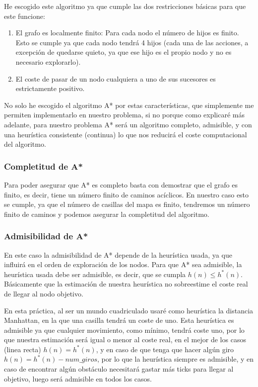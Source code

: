 \documentclass[10pt, spanish]{article}
\begin{document}
He escogido este algoritmo ya que cumple las dos restricciones básicas para que este funcione:

\begin{enumerate}
	\item El grafo es localmente finito: Para cada nodo el número de hijos es finito. Esto se cumple ya que cada nodo tendrá 4 hijos (cada una de las acciones, a excepción de quedarse quieto, ya que ese hijo es el propio nodo y no es necesario explorarlo).
	\item El coste de pasar de un nodo cualquiera a uno de sus sucesores es estrictamente positivo.
\end{enumerate}

No solo he escogido el algoritmo A* por estas características, que simplemente me permiten implementarlo en nuestro problema, si no porque como explicaré más adelante, para nuestro problema A* será un algoritmo completo, admisible, y con una heurística consistente (continua) lo que nos reducirá el coste computacional del algoritmo.

\subsubsection{Completitud de A*}

Para poder asegurar que A* es completo basta con demostrar que el grafo es finito, es decir, tiene un número finito de caminos acíclicos. En nuestro caso esto se cumple, ya que el número de casillas del mapa es finito, tendremos un número finito de caminos y podemos asegurar la completitud del algoritmo.

\subsubsection{Admisibilidad de A*}

En este caso la admisibilidad de A* depende de la heurística usada, ya que influirá en el orden de exploración de los nodos. Para que A* sea admisible, la heurística usada debe ser admisible, es decir, que se cumpla $h(n) \leq h^*(n)$. Básicamente que la estimación de nuestra heurística no sobreestime el coste real de llegar al nodo objetivo.

En esta práctica, al ser un mundo cuadriculado usaré como heurística la distancia Manhattan, en la que una casilla tendrá un coste de uno. Esta heurística es admisible ya que cualquier movimiento, como mínimo, tendrá coste uno, por lo que nuestra estimación será igual o menor al coste real, en el mejor de los casos (linea recta) $h(n) = h^*(n)$, y en caso de que tenga que hacer algún giro $h(n) = h^*(n) - num\_giros$, por lo que la heurística siempre es admisible, y en caso de encontrar algún obstáculo necesitará gastar más ticks para llegar al objetivo, luego será admisible en todos los casos.
\end{document}
